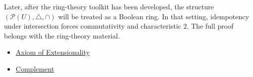 \begin{remark*}[Exposition]
Later, after the ring-theory toolkit has been developed, the structure
\((\mathcal P(U),\triangle,\cap)\) will be treated as a Boolean ring. In that
setting, idempotency under intersection forces commutativity and characteristic
\(2\). The full proof belongs with the ring-theory material.
\end{remark*}

\begin{dependencies}
\begin{itemize}
  \item \hyperref[ax:extensionality]{Axiom of Extensionality}
  \item \hyperref[def:complement]{Complement}
\end{itemize}
\end{dependencies}
